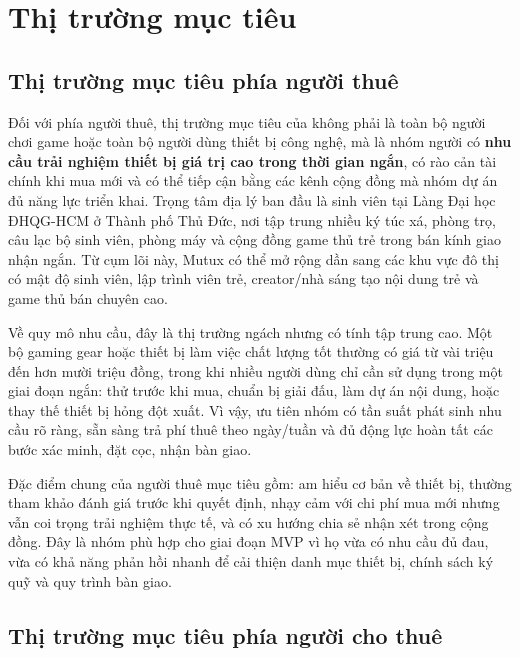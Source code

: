 
\section{Thị trường mục tiêu}

\subsection{Thị trường mục tiêu phía người thuê}

Đối với phía người thuê, thị trường mục tiêu của \projectname{} không phải là toàn bộ người chơi game hoặc toàn bộ người dùng thiết bị công nghệ, mà là nhóm người có \textbf{nhu cầu trải nghiệm thiết bị giá trị cao trong thời gian ngắn}, có rào cản tài chính khi mua mới và có thể tiếp cận bằng các kênh cộng đồng mà nhóm dự án đủ năng lực triển khai. Trọng tâm địa lý ban đầu là sinh viên tại Làng Đại học ĐHQG-HCM ở Thành phố Thủ Đức, nơi tập trung nhiều ký túc xá, phòng trọ, câu lạc bộ sinh viên, phòng máy và cộng đồng game thủ trẻ trong bán kính giao nhận ngắn. Từ cụm lõi này, Mutux có thể mở rộng dần sang các khu vực đô thị có mật độ sinh viên, lập trình viên trẻ, creator/nhà sáng tạo nội dung trẻ và game thủ bán chuyên cao.

Về quy mô nhu cầu, đây là thị trường ngách nhưng có tính tập trung cao. Một bộ gaming gear hoặc thiết bị làm việc chất lượng tốt thường có giá từ vài triệu đến hơn mười triệu đồng, trong khi nhiều người dùng chỉ cần sử dụng trong một giai đoạn ngắn: thử trước khi mua, chuẩn bị giải đấu, làm dự án nội dung, hoặc thay thế thiết bị hỏng đột xuất. Vì vậy, \projectname{} ưu tiên nhóm có tần suất phát sinh nhu cầu rõ ràng, sẵn sàng trả phí thuê theo ngày/tuần và đủ động lực hoàn tất các bước xác minh, đặt cọc, nhận bàn giao.

Đặc điểm chung của người thuê mục tiêu gồm: am hiểu cơ bản về thiết bị, thường tham khảo đánh giá trước khi quyết định, nhạy cảm với chi phí mua mới nhưng vẫn coi trọng trải nghiệm thực tế, và có xu hướng chia sẻ nhận xét trong cộng đồng. Đây là nhóm phù hợp cho giai đoạn MVP vì họ vừa có nhu cầu đủ đau, vừa có khả năng phản hồi nhanh để \projectname{} cải thiện danh mục thiết bị, chính sách ký quỹ và quy trình bàn giao.

\subsection{Thị trường mục tiêu phía người cho thuê}

